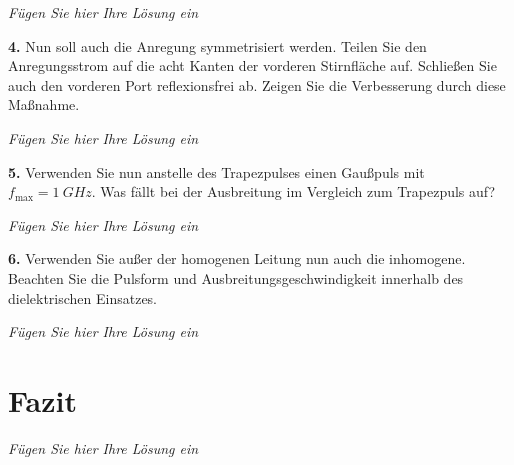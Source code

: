 \documentclass[Protokollheft.tex]{subfiles}
\begin{document}
\emph{Fügen Sie hier Ihre Lösung ein}

\begin{framed}
	\noindent \textbf{4.} Nun soll auch die Anregung symmetrisiert werden. Teilen Sie
den Anregungsstrom auf die acht Kanten der vorderen Stirnfläche
auf. Schließen Sie auch den vorderen Port reflexionsfrei ab.
Zeigen Sie die Verbesserung durch diese Maßnahme.\label{exer:symmetrizeExcitation}
\end{framed}

\emph{Fügen Sie hier Ihre Lösung ein}

\begin{framed}
	\noindent \textbf{5.} Verwenden Sie nun anstelle des Trapezpulses einen Gaußpuls
mit $f_{\text{max}}=\SI{1}{GHz}$. Was fällt bei der Ausbreitung im Vergleich
zum Trapezpuls auf?\label{exer:gaussExcitation}
\end{framed}

\emph{Fügen Sie hier Ihre Lösung ein}

\begin{framed}
	\noindent \textbf{6.} Verwenden Sie außer der homogenen Leitung nun auch die
inhomogene. Beachten Sie die Pulsform und
Ausbreitungsgeschwindigkeit innerhalb des dielektrischen
Einsatzes.\label{exer:inhomogenTLine}
\end{framed}

\emph{Fügen Sie hier Ihre Lösung ein}



\section{Fazit}
\emph{Fügen Sie hier Ihre Lösung ein}
\end{document}
